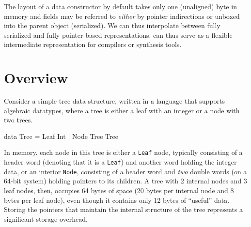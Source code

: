 \documentclass[showabstract,showacknowledgments,showpreface,showdedication]{iuphd}
\theoremstyle{nonumberplain}
\newcommand{\il}[1]{\lstinline[style=inline,mathescape=true];#1;}
\begin{document}
The layout of a \ourcalc data constructor by default takes only one
(unaligned) byte in memory and fields may be referred to \emph{either} by
pointer indirections or unboxed into the parent object (serialized).  We can
thus interpolate between fully serialized and fully pointer-based
representations.
%
{\ourcalc can thus serve as a flexible intermediate representation
  for compilers or synthesis tools.}





\section{Overview}\label{sec:intro-overview}

Consider a simple tree data structure, written in a language that supports algebraic datatypes,
where a tree is either a leaf with an integer or a node with two trees.

\begin{code}
data Tree = Leaf Int | Node Tree Tree
\end{code}
%
In memory, each node in this tree is either a \il{Leaf} node, typically
consisting of a header word (denoting that it is a \il{Leaf}) and another word
holding the integer data, or an interior \il{Node}, consisting of a header word
and {\em two} double words (on a 64-bit system) holding pointers to its
children. A tree with 2 internal nodes and 3 leaf nodes, then, occupies 64 bytes
of space (20 bytes per internal node and 8 bytes per leaf node), even though it
contains only 12 bytes of ``useful'' data.  Storing the pointers that maintain
the internal structure of the tree represents a significant storage overhead.
\end{document}
